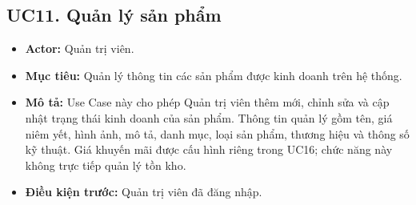 \documentclass[12pt,a4paper]{article}
\begin{document}

\subsection{UC11. Quản lý sản phẩm}

\begin{itemize}

 \item \textbf{Actor:} Quản trị viên.

 \item \textbf{Mục tiêu:} Quản lý thông tin các sản phẩm được kinh doanh trên hệ thống.

 \item \textbf{Mô tả:} Use Case này cho phép Quản trị viên thêm mới, chỉnh sửa và cập nhật trạng thái kinh doanh của sản phẩm. Thông tin quản lý gồm tên, giá niêm yết, hình ảnh, mô tả, danh mục, loại sản phẩm, thương hiệu và thông số kỹ thuật. Giá khuyến mãi được cấu hình riêng trong UC16; chức năng này không trực tiếp quản lý tồn kho.

 \item \textbf{Điều kiện trước:} Quản trị viên đã đăng nhập.


\end{itemize}
\end{document}
